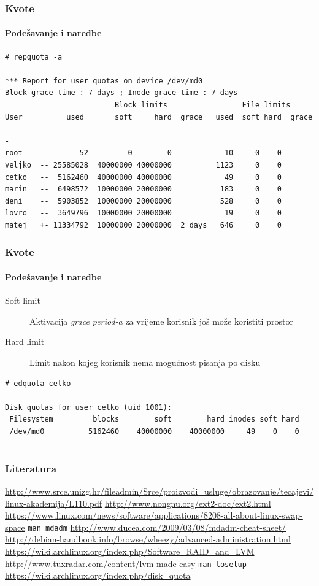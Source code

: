 \documentclass[t]{beamer}
\begin{document}
\begin{frame}[fragile]
	\frametitle{Kvote}
	\framesubtitle{Podešavanje i naredbe}
	{\footnotesize \begin{verbatim}
# repquota -a

*** Report for user quotas on device /dev/md0
Block grace time : 7 days ; Inode grace time : 7 days
                         Block limits                 File limits
User          used       soft     hard  grace   used  soft hard  grace
-----------------------------------------------------------------------
root    --       52         0        0            10     0    0
veljko  -- 25585028  40000000 40000000          1123     0    0
cetko   --  5162460  40000000 40000000            49     0    0
marin   --  6498572  10000000 20000000           183     0    0
deni    --  5903852  10000000 20000000           528     0    0
lovro   --  3649796  10000000 20000000            19     0    0
matej   +- 11334792  10000000 20000000  2 days   646     0    0
	\end{verbatim}}
\end{frame}

\begin{frame}[fragile]
	\frametitle{Kvote}
	\framesubtitle{Podešavanje i naredbe}
	\begin{description}
		\item[Soft limit] Aktivacija \emph{grace period-a} za vrijeme korisnik još može koristiti prostor
		\item[Hard limit] Limit nakon kojeg korisnik nema mogućnost pisanja po disku
	\end{description}
	\vspace{1em}
	{\footnotesize \begin{verbatim}
# edquota cetko

Disk quotas for user cetko (uid 1001):
 Filesystem         blocks        soft        hard inodes soft hard
 /dev/md0          5162460    40000000    40000000     49    0    0
	\end{verbatim}}
\end{frame}

\section*{}
\begin{frame}
	\frametitle{Literatura}
    \url{http://www.srce.unizg.hr/fileadmin/Srce/proizvodi_usluge/obrazovanje/tecajevi/linux-akademija/L110.pdf}
    \url{http://www.nongnu.org/ext2-doc/ext2.html}
    \url{https://www.linux.com/news/software/applications/8208-all-about-linux-swap-space}
	\texttt{man mdadm}
	\url{http://www.ducea.com/2009/03/08/mdadm-cheat-sheet/}
	\vfill
	\url{http://debian-handbook.info/browse/wheezy/advanced-administration.html}\\
	\url{https://wiki.archlinux.org/index.php/Software_RAID_and_LVM}\\
	\url{http://www.tuxradar.com/content/lvm-made-easy}
	\vfill
	\texttt{man losetup}
	\vfill
	\url{https://wiki.archlinux.org/index.php/disk_quota}
\end{frame}
\end{document}
